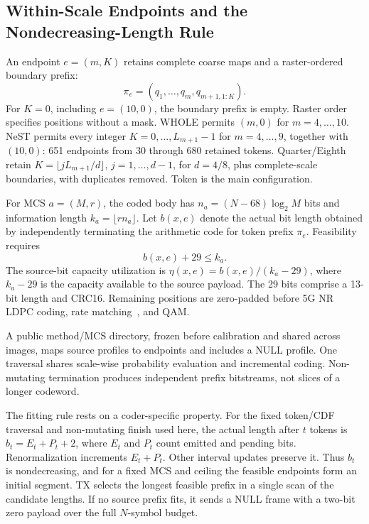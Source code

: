 \subsection{Within-Scale Endpoints and the Nondecreasing-Length Rule}
An endpoint $e=(m,K)$ retains complete coarse maps and a raster-ordered boundary prefix:
\begin{equation}
\pi_e=(q_1,\ldots,q_m,q_{m+1,1:K}).
\label{eq:prefix}
\end{equation}
For $K=0$, including $e=(10,0)$, the boundary prefix is empty. Raster order specifies positions without a mask. WHOLE permits $(m,0)$ for $m=4,\ldots,10$. NeST permits every integer $K=0,\ldots,L_{m+1}-1$ for $m=4,\ldots,9$, together with $(10,0)$: 651 endpoints from 30 through 680 retained tokens. Quarter/Eighth retain $K=\lfloor jL_{m+1}/d\rfloor$, $j=1,\ldots,d-1$, for $d=4/8$, plus complete-scale boundaries, with duplicates removed. Token is the main configuration.

For MCS $a=(M,r)$, the coded body has $n_a=(N-68)\log_2M$ bits and information length $k_a=\lfloor rn_a\rfloor$. Let $b(x,e)$ denote the actual bit length obtained by independently terminating the arithmetic code for token prefix $\pi_e$. Feasibility requires
\begin{equation}
b(x,e)+29\leq k_a.
\label{eq:budget}
\end{equation}
The source-bit capacity utilization is $\eta(x,e)=b(x,e)/(k_a-29)$, where $k_a-29$ is the capacity available to the source payload. The 29 bits comprise a 13-bit length and CRC16. Remaining positions are zero-padded before 5G NR LDPC coding, rate matching~\cite{nr}, and QAM.

A public method/MCS directory, frozen before calibration and shared across images, maps source profiles to endpoints and includes a NULL profile. One traversal shares scale-wise probability evaluation and incremental coding. Non-mutating termination produces independent prefix bitstreams, not slices of a longer codeword.

The fitting rule rests on a coder-specific property. For the fixed token/CDF traversal and non-mutating finish used here, the actual length after $t$ tokens is $b_t=E_t+P_t+2$, where $E_t$ and $P_t$ count emitted and pending bits. Renormalization increments $E_t+P_t$. Other interval updates preserve it. Thus $b_t$ is nondecreasing, and for a fixed MCS and ceiling the feasible endpoints form an initial segment. TX selects the longest feasible prefix in a single scan of the candidate lengths. If no source prefix fits, it sends a NULL frame with a two-bit zero payload over the full $N$-symbol budget.

